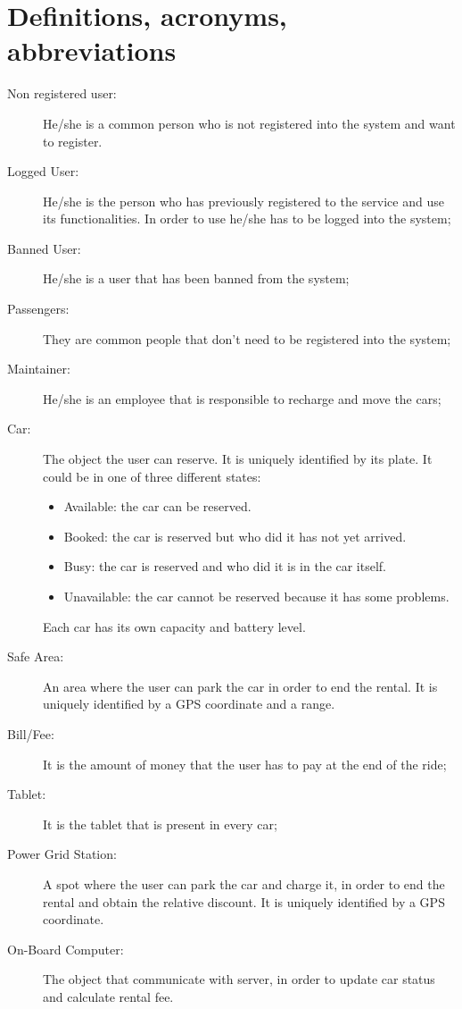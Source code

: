 \section{Definitions, acronyms, abbreviations}
\begin{description}
    \item[Non registered user:] He/she is a common person who is not registered into the system and want to register.
	\item [Logged User:] He/she is the person who has previously registered to the service and use its functionalities. In order to use he/she has to be logged into the system;
	\item[Banned User:] He/she is a user that has been banned from the system;
	\item[Passengers:] They are common people that don't need to be registered into the system;
	\item[Maintainer:] He/she is an employee that is responsible to recharge and move the cars;
	\item [Car:] The object the user can reserve. It is uniquely identified by its plate. It could be in one of three different states:
	\begin{itemize}
		\item Available: the car can be reserved.
		\item Booked: the car is reserved but who did it has not yet arrived.
		\item Busy: the car is reserved and who did it is in the car itself.
		\item Unavailable: the car cannot be reserved because it has some problems.
	\end{itemize}
	Each car has its own capacity and battery level.
	\item [Safe Area:] An area where the user can park the car in order to end the rental. It is uniquely identified by a GPS coordinate and a range.
	\item[Bill/Fee:] It is the amount of money that the user has to pay at the end of the ride;
	\item[Tablet:] It is the tablet that is present in every car;
	\item [Power Grid Station:] A spot where the user can park the car and charge it, in order to end the rental and obtain the relative discount. It is uniquely identified by a GPS coordinate.
	\item [On-Board Computer:] The object that communicate with server, in order to update car status and calculate rental fee.

\end{description}
